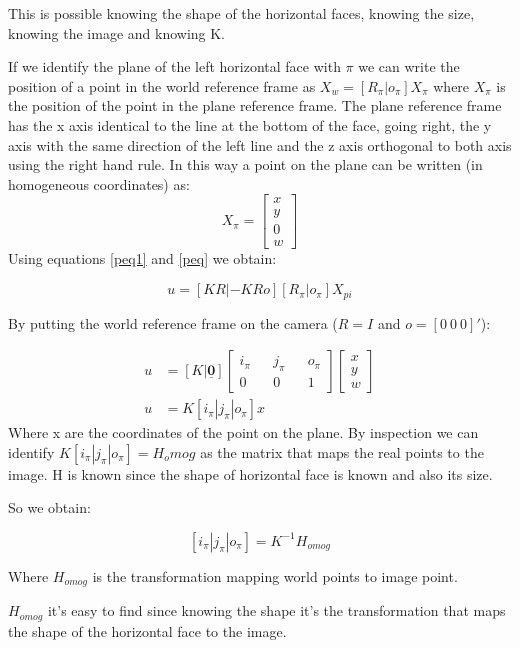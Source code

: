 \documentclass[11pt, oneside]{article}   	%
\begin{document}
This is possible knowing the shape of the horizontal faces, knowing the size, knowing the image and knowing K.

If we identify the plane of the left horizontal face with $\pi$ we can write the position of a point in the world reference frame as $ X_w =[R_{\pi} | o_{\pi}]X_{\pi} $ where $X_{\pi} $ is the position of the point in the plane reference frame. 
The plane reference frame has the x axis identical to the line at the bottom of the face, going right, the y axis with the same direction of the left line and the z axis orthogonal to both axis using the right hand rule.
In this way a point on the plane can be written (in homogeneous coordinates) as:
$$
X_\pi = \begin{bmatrix}
x \\
y \\
0 \\
w
\end{bmatrix}
$$
Using equations \ref{peq1} and \ref{peq} we obtain:

$$
u = [KR | -KRo] [R_{\pi} | o_{\pi}]X_{pi}
$$

By putting the world reference frame on the camera ($R=I$ and $o=[0 \ 0\ 0]'$):

\begin{subequations}
\begin{align*}
u  & = [K|\underline{\mathbf{0}}]
\begin{bmatrix}
i_\pi && j_\pi && o_\pi \\
0 && 0 && 1
\end{bmatrix} \begin{bmatrix}
x \\ y \\ w
\end{bmatrix} \\
u & = K [i_\pi | j_\pi | o_\pi] x
\end{align*}
\end{subequations}
Where x are the coordinates of the point on the plane. 
By inspection we can identify $K [i_\pi | j_\pi | o_\pi] = H_omog$ as the matrix that maps the real points to the image. H is known since the shape of horizontal face is known and also its size.

So we obtain:

$$[i_\pi | j_\pi | o_\pi]= K^{-1}H_{omog} $$

Where $H_{omog}$ is the transformation mapping world points to image point. 

$H_{omog}$ it's easy to find since knowing the shape it's the transformation that maps the shape of the horizontal face to the image. 
\end{document}

